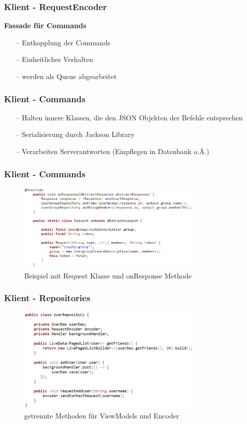 \documentclass[aspectratio=1610]{beamer}
\begin{document}
	\begin{frame}[plain]
	\frametitle{Klient - RequestEncoder}
	\textbf{Fassade für Commands}
	\begin{itemize}
		\setlength\itemsep{0.3em}
		\item[--] Entkopplung der Commands
		\item[--] Einheitliches Verhalten
		\item[--] werden als Queue abgearbeitet
 	\end{itemize}
	\end{frame}

	\begin{frame}[plain]
	\frametitle{Klient - Commands}
	\begin{itemize}
		\setlength\itemsep{0.3em}
		\item[--] Halten innere Klassen, die den JSON Objekten der Befehle entsprechen
		\item[--] Serialisierung durch Jackson Library
		\item[--] Verarbeiten Serverantworten (Einpflegen in Datenbank o.Ä.)
 	\end{itemize}
	\end{frame}

	\begin{frame}[plain]
	\frametitle{Klient - Commands}
	\begin{figure}[h]
		\centering
		\includegraphics[width=0.8\textwidth]{images/CreateGroupCommand.PNG}
		\caption{Beispiel mit Request Klasse und onResponse Methode}
	\end{figure}
	\end{frame}

	\begin{frame}[plain]
	\frametitle{Klient - Repositories}
	\begin{figure}[h]
		\centering
		\includegraphics[width=0.8\textwidth]{images/UserRepository.PNG}
		\caption{getrennte Methoden für ViewModels und Encoder}
	\end{figure}
	\end{frame}
\end{document}
